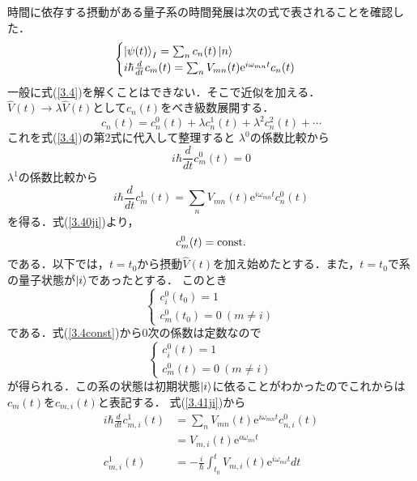 \documentclass{standalone}
\begin{document}
  時間に依存する摂動がある量子系の時間発展は次の式で表されることを確認した．
  \begin{equation}
    \begin{cases}
      \label{3.4}
    \ket{\psi(t)}_I=\sum_{n}c_n(t)\ket{n}\\
    i\hbar\frac{d}{dt}c_m(t)=\sum_{n}V_{mn}(t)\mathrm{e}^{i\omega_{mn}t}c_n(t)
    \end{cases}
  \end{equation}
  一般に式(\ref{3.4})を解くことはできない．そこで近似を加える．\\
  $\hat{V}(t)\to\lambda\hat{V}(t)$として$c_n(t)$をべき級数展開する．
  \begin{equation}
    c_n(t)=c_n^0(t)+\lambda c_n^1(t)+\lambda^2c_n^2(t)+\cdots
  \end{equation}
  これを式(\ref{3.4})の第2式に代入して整理すると
  $\lambda^0$の係数比較から
  \begin{equation}
    \label{3.40ji}
    i\hbar\frac{d}{dt}c_m^0(t)=0
  \end{equation}
  $\lambda^1$の係数比較から
  \begin{equation}
    \label{3.41ji}
    i\hbar\frac{d}{dt}c_m^1(t)=\sum_{n}V_{mn}(t)\mathrm{e}^{i\omega_{mn}t}c_n^0(t)
  \end{equation}
  を得る．式(\ref{3.40ji})より，
  \begin{equation}
    \label{3.4const}
    c_m^0(t)=\rm{const.}
  \end{equation}
  である．以下では，$t=t_0$から摂動$\hat{V}(t)$を加え始めたとする．また，$t=t_0$で系の量子状態が$\ket{i}$であったとする．
  このとき
  \begin{equation}
    \begin{cases}
      c_i^0(t_0)=1\\
      c_m^0(t_0)=0\ (m\ne i)
    \end{cases}
  \end{equation}
  である．式(\ref{3.4const})から0次の係数は定数なので
  \begin{equation}
    \begin{cases}
      c_i^0(t)=1\\
      c_m^0(t)=0\ (m\ne i)
    \end{cases}
  \end{equation}
  が得られる．この系の状態は初期状態$\ket{i}$に依ることがわかったのでこれからは$c_m(t)$を$c_{m,i}(t)$と表記する．
  式(\ref{3.41ji})から
  \begin{align}
    i\hbar\frac{d}{dt}c_{m,i}^1(t)&=\sum_{n}V_{mn}(t)\mathrm{e}^{i\omega_{mn}t}c_{n,i}^0(t)\\
    &=V_{m,i}(t)\mathrm{e}^{o\omega_{mi}t}\\
    c_{m,i}^1(t)&=-\frac{i}{\hbar}\int_{t_0}^{t}V_{m,i}(t)\mathrm{e}^{i\omega_{mi}t}dt
  \end{align}
\end{document}
